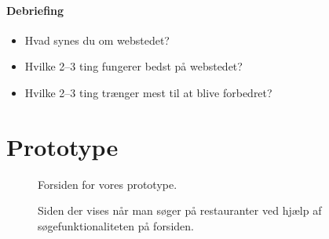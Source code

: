 \documentclass[a4paper, 12pt]{article}
\begin{document}
\paragraph{Debriefing}
\begin{itemize}
\item Hvad synes du om webstedet?
\item Hvilke 2--3 ting fungerer bedst på webstedet?
\item Hvilke 2--3 ting trænger mest til at blive forbedret?
\end{itemize}

\section{Prototype}
\label{appx:prototype}

\begin{figure}[hp]
  \centering
  \caption{Forsiden for vores prototype.}
\end{figure}

\begin{figure}[hp]
  \centering
  \caption{Siden der vises når man søger på restauranter ved hjælp af
    søgefunktionaliteten på forsiden.}
\end{figure}
\end{document}
